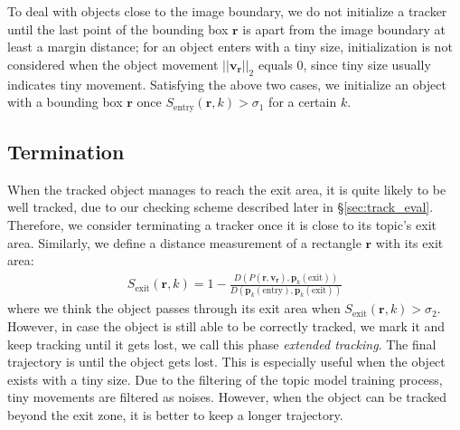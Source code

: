     To deal with objects close to the image boundary, we do not initialize a tracker until the last point of the bounding box $\bm{r}$ is apart from the image boundary at least a margin distance; for an object enters with a tiny size, initialization is not considered when the object movement $||\bm{v_r}||_2$ equals $0$, since tiny size usually indicates tiny movement.
    Satisfying the above two cases, we initialize an object with a bounding box $\bm{r}$ once $S_{\text{entry}}(\bm{r}, k) > \sigma_{1}$ for a certain $k$. 

\subsection{Termination}
    When the tracked object manages to reach the exit area, it is quite likely to be well tracked, due to our checking scheme described later in \S\ref{sec:track_eval}. Therefore, we consider terminating a tracker once it is close to its topic's exit area. 
    Similarly, we define a distance measurement of a rectangle $\bm{r}$ with its exit area:
    \begin{align}
        S_\text{exit}(\bm{r}, k) = 1-\frac{D\left(P(\bm{r}, \bm{v_r}), \bm{p}_k(\text{exit})\right)}{D\left(\bm{p}_k(\text{entry}), \bm{p}_k(\text{exit})\right)}
    \end{align}
    where we think the object passes through its exit area when $S_\text{exit}(\bm{r}, k) > \sigma_2$.
    However, in case the object is still able to be correctly tracked, we mark it and keep tracking until it gets lost, we call this phase \emph{extended tracking}. 
    The final trajectory is until the object gets lost. This is especially useful when the object exists with a tiny size. Due to the filtering of the topic model training process, tiny movements are filtered as noises. However, when the object can be tracked beyond the exit zone, it is better to keep a longer trajectory. 


